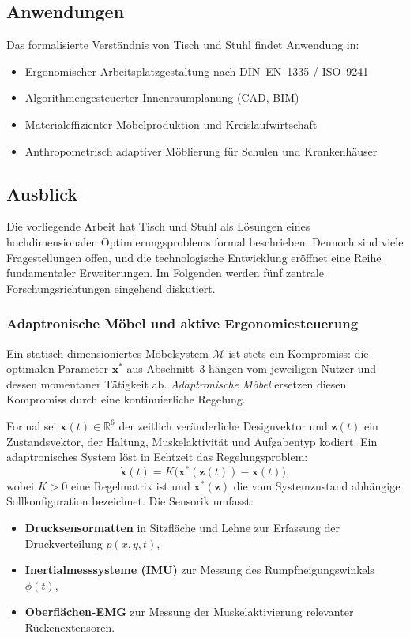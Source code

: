 \documentclass[a4paper,12pt]{article}
\theoremstyle{definition}
\begin{document}
\subsection{Anwendungen}

Das formalisierte Verst\"{a}ndnis von Tisch und Stuhl findet Anwendung in:
\begin{itemize}
	\item Ergonomischer Arbeitsplatzgestaltung nach DIN~EN~1335 / ISO~9241~\cite{DINEN1335, ISO9241}
	\item Algorithmengesteuerter Innenraumplanung (CAD, BIM)
	\item Materialeffizienter M\"{o}belproduktion und Kreislaufwirtschaft
	\item Anthropometrisch adaptiver M\"{o}blierung f\"{u}r Schulen und Krankenh\"{a}user
\end{itemize}

\subsection{Ausblick}

Die vorliegende Arbeit hat Tisch und Stuhl als L\"{o}sungen eines hochdimensionalen
Optimierungsproblems formal beschrieben. Dennoch sind viele Fragestellungen offen,
und die technologische Entwicklung er\"{o}ffnet eine Reihe fundamentaler Erweiterungen.
Im Folgenden werden f\"{u}nf zentrale Forschungsrichtungen eingehend diskutiert.

\subsubsection{Adaptronische M\"{o}bel und aktive Ergonomiesteuerung}

Ein statisch dimensioniertes M\"{o}belsystem $\mathcal{M}$ ist stets ein Kompromiss: die
optimalen Parameter $\mathbf{x}^*$ aus Abschnitt~3 h\"{a}ngen vom jeweiligen Nutzer und
dessen momentaner T\"{a}tigkeit ab. \emph{Adaptronische M\"{o}bel} ersetzen diesen
Kompromiss durch eine kontinuierliche Regelung.

Formal sei $\mathbf{x}(t) \in \mathbb{R}^6$ der zeitlich ver\"{a}nderliche Designvektor
und $\mathbf{z}(t)$ ein Zustandsvektor, der Haltung, Muskelaktivit\"{a}t und
Aufgabentyp kodiert. Ein adaptronisches System l\"{o}st in Echtzeit das
Regelungsproblem:
\[
	\dot{\mathbf{x}}(t) = K\bigl(\mathbf{x}^*(\mathbf{z}(t)) - \mathbf{x}(t)\bigr),
\]
wobei $K > 0$ eine Regelmatrix ist und $\mathbf{x}^*(\mathbf{z})$ die vom Systemzustand
abh\"{a}ngige Sollkonfiguration bezeichnet. Die Sensorik umfasst:
\begin{itemize}
	\item \textbf{Drucksensormatten} in Sitzfl\"{a}che und Lehne zur Erfassung der
	      Druckverteilung $p(x, y, t)$,
	\item \textbf{Inertialmesssysteme (IMU)} zur Messung des Rumpfneigungswinkels
	      $\phi(t)$,
	\item \textbf{Oberfl\"{a}chen-EMG} zur Messung der Muskelaktivierung relevanter
	      R\"{u}ckenextensoren.
\end{itemize}
\end{document}
